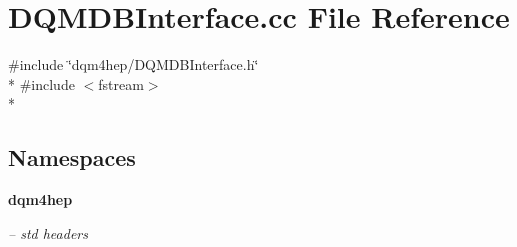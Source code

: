 \section{D\+Q\+M\+D\+B\+Interface.\+cc File Reference}
\label{DQMDBInterface_8cc}
{\ttfamily \#include \char`\"{}dqm4hep/\+D\+Q\+M\+D\+B\+Interface.\+h\char`\"{}}\\*
{\ttfamily \#include $<$fstream$>$}\\*
\subsection*{Namespaces}
\begin{DoxyCompactItemize}
\item 
 {\bf dqm4hep}
\begin{DoxyCompactList}\small\item\em -- std headers \end{DoxyCompactList}\end{DoxyCompactItemize}
